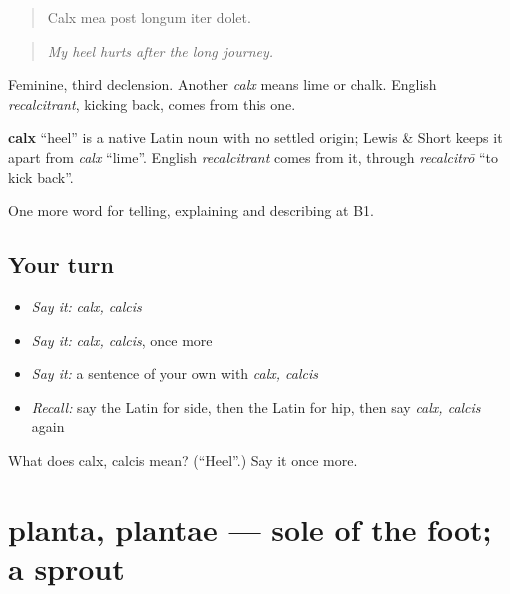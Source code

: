 \begin{quote}
Calx mea post longum iter dolet.
\end{quote}

\begin{quote}
\emph{My heel hurts after the long journey.}
\end{quote}

Feminine, third declension. Another \emph{calx} means lime or chalk. English \emph{recalcitrant}, kicking back, comes from this one.

\begin{cousinweb}
\textbf{calx} \textquotedblleft{}heel\textquotedblright{} is a native Latin noun with no settled origin; Lewis \& Short keeps it apart from \emph{calx} \textquotedblleft{}lime\textquotedblright{}. English \emph{recalcitrant} comes from it, through \emph{recalcitrō} \textquotedblleft{}to kick back\textquotedblright{}.
\end{cousinweb}

\begin{grammarlens}[title={What you've built}]
One more word for telling, explaining and describing at B1.
\end{grammarlens}

\subsection*{Your turn}
\begin{itemize}
\raggedright
  \item \emph{Say it:} \emph{calx, calcis}
  \item \emph{Say it:} \emph{calx, calcis}, once more
  \item \emph{Say it:} a sentence of your own with \emph{calx, calcis}
  \item \emph{Recall:} say the Latin for side, then the Latin for hip, then say \emph{calx, calcis} again
\end{itemize}

\begin{tcolorbox}[breakable,colback=teal!4,colframe=teal!35!black,title={Before you move on}]
What does calx, calcis mean? (\textquotedblleft{}Heel\textquotedblright{}.) Say it once more.
\end{tcolorbox}
\section[planta, plantae]{planta, plantae — sole of the foot; a sprout}

